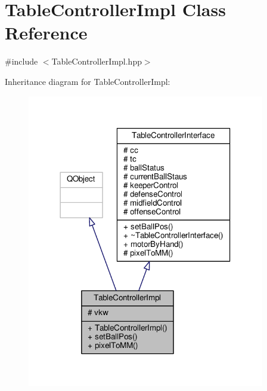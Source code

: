 \hypertarget{class_table_controller_impl}{}\section{Table\+Controller\+Impl Class Reference}
\label{class_table_controller_impl}


{\ttfamily \#include $<$Table\+Controller\+Impl.\+hpp$>$}



Inheritance diagram for Table\+Controller\+Impl\+:\nopagebreak
\begin{figure}[H]
\begin{center}
\leavevmode
\includegraphics[width=294pt]{class_table_controller_impl__inherit__graph}
\end{center}
\end{figure}


